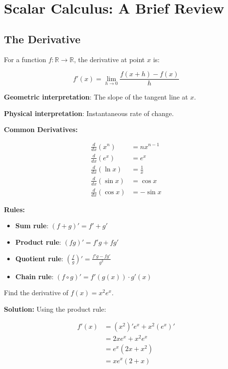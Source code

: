 \section{Scalar Calculus: A Brief Review}

\subsection{The Derivative}

\begin{definition}[Derivative]
For a function $f: \mathbb{R} \to \mathbb{R}$, the derivative at point $x$ is:

\begin{equation}
    f'(x) = \lim_{h \to 0} \frac{f(x + h) - f(x)}{h}
\end{equation}

\textbf{Geometric interpretation}: The slope of the tangent line at $x$.

\textbf{Physical interpretation}: Instantaneous rate of change.
\end{definition}

\begin{seanbox}{6.1}
\textbf{Common Derivatives:}

\begin{align}
    \frac{d}{dx}(x^n) &= nx^{n-1} \\
    \frac{d}{dx}(e^x) &= e^x \\
    \frac{d}{dx}(\ln x) &= \frac{1}{x} \\
    \frac{d}{dx}(\sin x) &= \cos x \\
    \frac{d}{dx}(\cos x) &= -\sin x
\end{align}

\textbf{Rules:}

\begin{itemize}
    \item \textbf{Sum rule}: $(f + g)' = f' + g'$
    \item \textbf{Product rule}: $(fg)' = f'g + fg'$
    \item \textbf{Quotient rule}: $\left(\frac{f}{g}\right)' = \frac{f'g - fg'}{g^2}$
    \item \textbf{Chain rule}: $(f \circ g)' = f'(g(x)) \cdot g'(x)$
\end{itemize}
\end{seanbox}

\begin{example}
Find the derivative of $f(x) = x^2 e^x$.

\textbf{Solution:} Using the product rule:

\begin{align}
    f'(x) &= (x^2)' e^x + x^2 (e^x)' \\
    &= 2x e^x + x^2 e^x \\
    &= e^x(2x + x^2) \\
    &= xe^x(2 + x)
\end{align}
\end{example}

